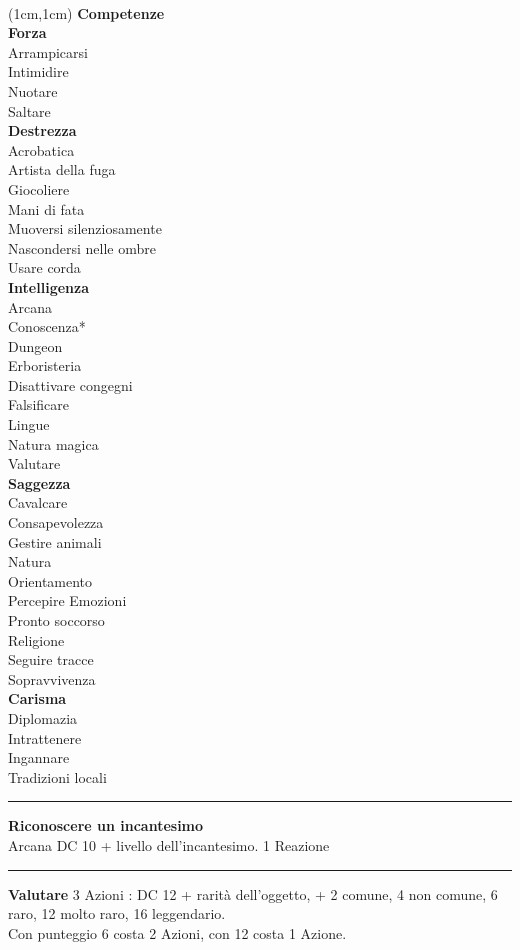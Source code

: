 \documentclass[a4paper,12 pt,openany]{book}
\newcommand{\riga}{\rule{\textwidth}{0.4pt}}
\begin{document}
~\newpage

\begin{textblock*}{4cm}(1cm,1cm) %
{\textbf{Competenze}\\
\textbf{Forza}\\
Arrampicarsi\\
Intimidire\\
Nuotare\\
Saltare	\\
\textbf{Destrezza}\\
Acrobatica\\
Artista della fuga\\
Giocoliere\\
Mani di fata\\
Muoversi silenziosamente\\
Nascondersi nelle ombre\\
Usare corda	\\
\textbf{Intelligenza}\\
Arcana\\
Conoscenza*\\
Dungeon\\
Erboristeria\\
Disattivare congegni\\
Falsificare\\
Lingue\\
Natura magica\\
Valutare\\
\textbf{Saggezza}\\
Cavalcare\\
Consapevolezza\\
Gestire animali\\
Natura\\
Orientamento\\
Percepire Emozioni\\
Pronto soccorso\\
Religione\\
Seguire tracce\\
Sopravvivenza\\
\textbf{Carisma}\\
Diplomazia\\
Intrattenere\\
Ingannare\\
Tradizioni locali
}

\riga

\textbf{Riconoscere un incantesimo}\\ Arcana DC 10 + livello dell'incantesimo. 1 Reazione

\riga

\textbf{Valutare} 3 Azioni : DC 12 + rarità dell'oggetto, + 2 comune, 4 non comune, 6 raro, 12 molto raro, 16 leggendario. \\
Con punteggio 6 costa 2 Azioni, con 12 costa 1 Azione.

\end{textblock*}
\end{document}
